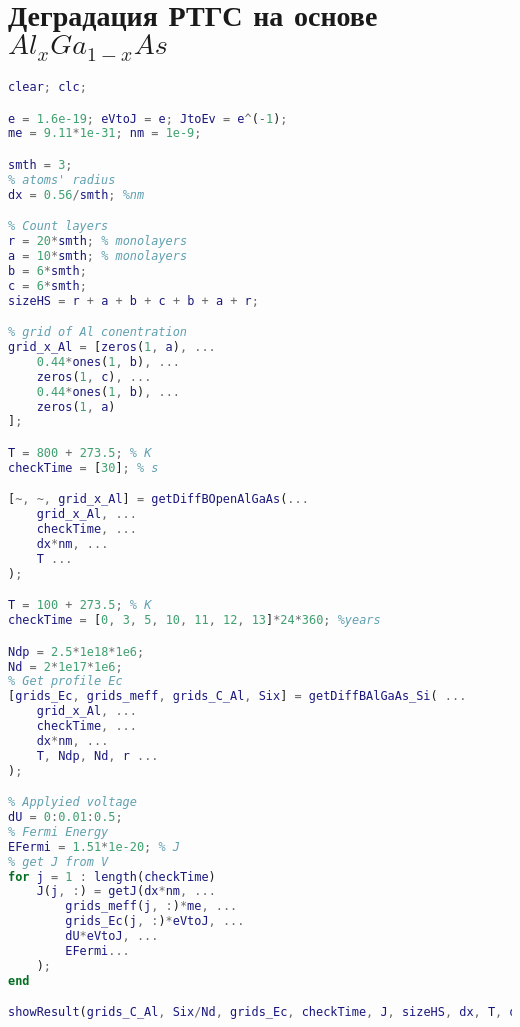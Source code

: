 \chapter{Деградация РТГС на основе $Al_{x}Ga_{1-x}As$}
\label{app:Degr}
\begin{lstlisting}[style=realcode,language=Matlab,caption={Деградация РТГС на основе $Al_{x}Ga_{1-x}As$},label={lst:Degr}]
clear; clc;

e = 1.6e-19; eVtoJ = e; JtoEv = e^(-1); 
me = 9.11*1e-31; nm = 1e-9;

smth = 3;
% atoms' radius
dx = 0.56/smth; %nm

% Count layers
r = 20*smth; % monolayers
a = 10*smth; % monolayers
b = 6*smth;
c = 6*smth;
sizeHS = r + a + b + c + b + a + r;

% grid of Al conentration
grid_x_Al = [zeros(1, a), ...
	0.44*ones(1, b), ...
	zeros(1, c), ...
	0.44*ones(1, b), ...
	zeros(1, a)
];

T = 800 + 273.5; % K
checkTime = [30]; % s

[~, ~, grid_x_Al] = getDiffBOpenAlGaAs(...
	grid_x_Al, ...
	checkTime, ...
	dx*nm, ...
	T ...
);

T = 100 + 273.5; % K
checkTime = [0, 3, 5, 10, 11, 12, 13]*24*360; %years

Ndp = 2.5*1e18*1e6;
Nd = 2*1e17*1e6;
% Get profile Ec
[grids_Ec, grids_meff, grids_C_Al, Six] = getDiffBAlGaAs_Si( ...
	grid_x_Al, ...
	checkTime, ...
	dx*nm, ...
	T, Ndp, Nd, r ...
);

% Applyied voltage
dU = 0:0.01:0.5;
% Fermi Energy
EFermi = 1.51*1e-20; % J
% get J from V
for j = 1 : length(checkTime)
	J(j, :) = getJ(dx*nm, ...
		grids_meff(j, :)*me, ...
		grids_Ec(j, :)*eVtoJ, ...
		dU*eVtoJ, ...
		EFermi...
	);
end

showResult(grids_C_Al, Six/Nd, grids_Ec, checkTime, J, sizeHS, dx, T, dU, Nd);
\end{lstlisting}